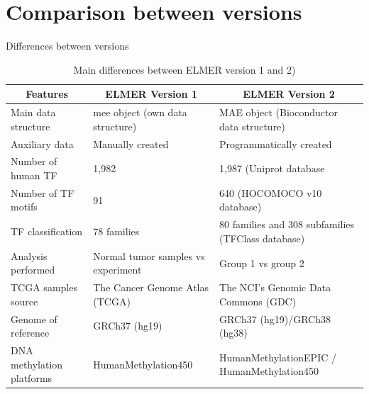\documentclass[slidestop,compress,11pt,xcolor=dvipsnames]{beamer}
\begin{document}
\section{Comparison between versions}

\begin{frame}{Differences between versions}
 \tiny{
  \begin{table}[h!]
   \centering
   \caption{Main differences between ELMER version 1 and 2)}
   \label{tab:summary}
   \begin{tabular}{@{}p{2.5cm}p{3.5cm}p{4cm}@{}}
    \toprule
    \multicolumn{1}{c}{\textbf{Features}} & \multicolumn{1}{c}{\textbf{ELMER Version 1}} & \multicolumn{1}{c}{\textbf{ELMER Version 2}}               \\ \midrule
    Main data structure                   & mee object (own data structure)              & MAE object (Bioconductor data structure)                   \\
    Auxiliary data                        & Manually created                             & Programmatically created                                   \\
    Number of human TF                    & 1,982                                        & 1,987 (Uniprot database                                    \\
    Number of TF motifs                   & 91                                           & 640  (HOCOMOCO v10 database)                               \\
    TF classification                     & 78 families                                  & 80 families and 308 subfamilies \newline(TFClass database) \\
    Analysis performed                    & Normal tumor samples vs experiment           & Group 1 vs group 2                                         \\
    TCGA samples source                   & The Cancer Genome Atlas (TCGA)               & The NCI's Genomic Data Commons (GDC)                       \\
    Genome of reference                   & GRCh37 (hg19)                                & GRCh37 (hg19)/GRCh38 (hg38)                                \\
    DNA methylation platforms             & HumanMethylation450                          & HumanMethylationEPIC / HumanMethylation450                 \\
    \bottomrule
   \end{tabular}
  \end{table}
 }
\end{frame}
\end{document}
